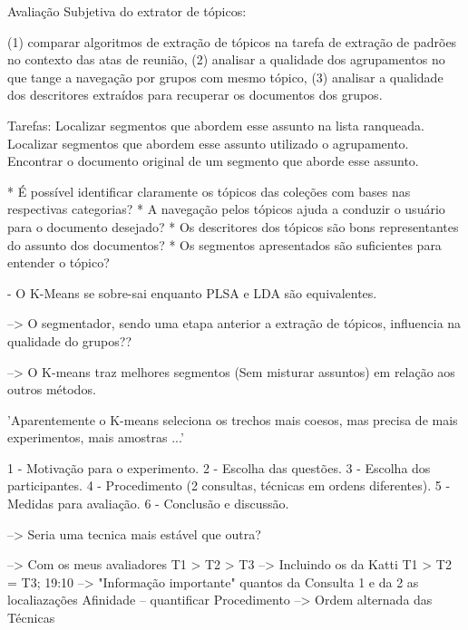 




Avaliação Subjetiva do extrator de tópicos:

(1) comparar algoritmos de extração de tópicos na tarefa de extração de padrões no contexto das atas de reunião, (2) analisar a qualidade dos agrupamentos no que tange a navegação por grupos com mesmo tópico, (3) analisar a qualidade dos descritores extraídos para recuperar os documentos dos grupos.


Tarefas:
Localizar segmentos que abordem esse assunto na lista ranqueada.
Localizar segmentos que abordem esse assunto utilizado o agrupamento.
Encontrar o documento original de um segmento que aborde esse assunto.

* É possível identificar claramente os tópicos das coleções com bases nas respectivas categorias?
* A navegação pelos tópicos ajuda a conduzir o usuário para o documento desejado?
* Os descritores dos tópicos são bons representantes do assunto dos documentos?
* Os segmentos apresentados são suficientes para entender o tópico?




 - O K-Means se sobre-sai enquanto PLSA e LDA são equivalentes.

--> O segmentador, sendo uma etapa anterior a extração de tópicos, influencia na qualidade do grupos??

--> O K-means traz melhores segmentos (Sem misturar assuntos) em relação aos outros métodos.

'Aparentemente o K-means seleciona os trechos mais coesos, mas precisa de mais experimentos, mais amostras ...'


 1 - Motivação para o experimento.
 2 - Escolha das questões.
 3 - Escolha dos participantes.
 4 - Procedimento (2 consultas, técnicas em ordens diferentes).
 5 - Medidas para avaliação.
 6 - Conclusão e discussão.



--> Seria uma tecnica mais estável que outra? 


--> Com os meus avaliadores T1 > T2 > T3
--> Incluindo os da Katti   T1 > T2 = T3;
19:10 --> "Informação importante"
quantos da Consulta 1 e da 2
as localiazações
Afinidade -- quantificar
Procedimento --> Ordem alternada das Técnicas


